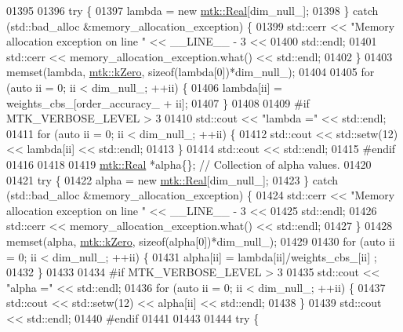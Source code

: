 \begin{DoxyCode}
{{01395 
01396   \textcolor{keywordflow}{try} \{
01397     lambda = \textcolor{keyword}{new} \hyperlink{group__c01-roots_gac080bbbf5cbb5502c9f00405f894857d}{mtk::Real}[dim\_null\_];
01398   \} \textcolor{keywordflow}{catch} (std::bad\_alloc &memory\_allocation\_exception) \{
01399     std::cerr << \textcolor{stringliteral}{"Memory allocation exception on line "} << \_\_LINE\_\_ - 3 <<
01400       std::endl;
01401     std::cerr << memory\_allocation\_exception.what() << std::endl;
01402   \}
01403   memset(lambda, \hyperlink{group__c01-roots_ga59a451a5fae30d59649bcda274fea271}{mtk::kZero}, \textcolor{keyword}{sizeof}(lambda[0])*dim\_null\_);
01404 
01405   \textcolor{keywordflow}{for} (\textcolor{keyword}{auto} ii = 0; ii < dim\_null\_; ++ii) \{
01406     lambda[ii] = weights\_cbs\_[order\_accuracy\_ + ii];
01407   \}
01408 
01409 \textcolor{preprocessor}{  #if MTK\_VERBOSE\_LEVEL > 3}
01410   std::cout << \textcolor{stringliteral}{"lambda ="} << std::endl;
01411   \textcolor{keywordflow}{for} (\textcolor{keyword}{auto} ii = 0; ii < dim\_null\_; ++ii) \{
01412     std::cout << std::setw(12) << lambda[ii] << std::endl;
01413   \}
01414   std::cout << std::endl;
01415 \textcolor{preprocessor}{  #endif}
01416 
01418 
01419   \hyperlink{group__c01-roots_gac080bbbf5cbb5502c9f00405f894857d}{mtk::Real} *alpha\{\}; \textcolor{comment}{// Collection of alpha values.}
01420 
01421   \textcolor{keywordflow}{try} \{
01422     alpha = \textcolor{keyword}{new} \hyperlink{group__c01-roots_gac080bbbf5cbb5502c9f00405f894857d}{mtk::Real}[dim\_null\_];
01423   \} \textcolor{keywordflow}{catch} (std::bad\_alloc &memory\_allocation\_exception) \{
01424     std::cerr << \textcolor{stringliteral}{"Memory allocation exception on line "} << \_\_LINE\_\_ - 3 <<
01425       std::endl;
01426     std::cerr << memory\_allocation\_exception.what() << std::endl;
01427   \}
01428   memset(alpha, \hyperlink{group__c01-roots_ga59a451a5fae30d59649bcda274fea271}{mtk::kZero}, \textcolor{keyword}{sizeof}(alpha[0])*dim\_null\_);
01429 
01430   \textcolor{keywordflow}{for} (\textcolor{keyword}{auto} ii = 0; ii < dim\_null\_; ++ii) \{
01431     alpha[ii] = lambda[ii]/weights\_cbs\_[ii] ;
01432   \}
01433 
01434 \textcolor{preprocessor}{  #if MTK\_VERBOSE\_LEVEL > 3}
01435   std::cout << \textcolor{stringliteral}{"alpha ="} << std::endl;
01436   \textcolor{keywordflow}{for} (\textcolor{keyword}{auto} ii = 0; ii < dim\_null\_; ++ii) \{
01437     std::cout << std::setw(12) << alpha[ii] << std::endl;
01438   \}
01439   std::cout << std::endl;
01440 \textcolor{preprocessor}{  #endif}
01441 
01443 
01444   \textcolor{keywordflow}{try} \{
}}
\end{DoxyCode}
